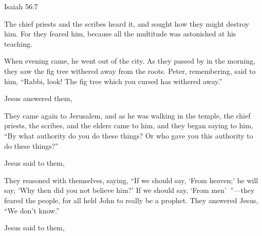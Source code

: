 {{Isaiah 56:7}
{}
\par }{\PP {}The chief priests and the scribes heard it, and sought how they might destroy him. For they feared him, because all the multitude was astonished at his teaching.
\par }{\PP {}When evening came, he went out of the city.
As they passed by in the morning, they saw the fig tree withered away from the roots.
Peter, remembering, said to him, “Rabbi, look! The fig tree which you cursed has withered away.”
\par }{\PP {}Jesus answered them,
{}
\par }{\PP {}They came again to Jerusalem, and as he was walking in the temple, the chief priests, the scribes, and the elders came to him,
and they began saying to him, “By what authority do you do these things? Or who gave you this authority to do these things?”
\par }{\PP {}Jesus said to them,
{}
\par }{\PP {}They reasoned with themselves, saying, “If we should say, ‘From heaven;’ he will say, ‘Why then did you not believe him?’
If we should say, ‘From men’ ”—they feared the people, for all held John to really be a prophet.
They answered Jesus, “We don’t know.”
\par }{\PP Jesus said to them,
{}

}
